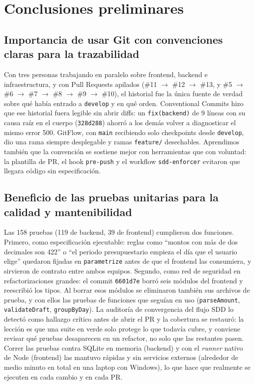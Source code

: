 \section{Conclusiones preliminares}

\subsection{Importancia de usar Git con convenciones claras para la trazabilidad}
Con tres personas trabajando en paralelo sobre frontend, backend e infraestructura, y con Pull Requests apilados (\#11 $\rightarrow$ \#12 $\rightarrow$ \#13, y \#5 $\rightarrow$ \#6 $\rightarrow$ \#7 $\rightarrow$ \#8 $\rightarrow$ \#9 $\rightarrow$ \#10), el historial fue la única fuente de verdad sobre qué había entrado a \texttt{develop} y en qué orden. Conventional Commits hizo que ese historial fuera legible sin abrir diffs: un \texttt{fix(backend)} de 9 líneas con su causa raíz en el cuerpo (\texttt{328d288}) ahorró a los demás volver a diagnosticar el mismo error 500. GitFlow, con \texttt{main} recibiendo solo checkpoints desde \texttt{develop}, dio una rama siempre desplegable y ramas \texttt{feature/} desechables. Aprendimos también que la convención se sostiene mejor con herramientas que con voluntad: la plantilla de PR, el hook \texttt{pre-push} y el workflow \texttt{sdd-enforcer} evitaron que llegara código sin especificación.

\subsection{Beneficio de las pruebas unitarias para la calidad y mantenibilidad}
Las 158 pruebas (119 de backend, 39 de frontend) cumplieron dos funciones. Primero, como especificación ejecutable: reglas como ``montos con más de dos decimales son 422'' o ``el periodo presupuestario empieza el día que el usuario elige'' quedaron fijadas en \texttt{parametrize} antes de que el frontend las consumiera, y sirvieron de contrato entre ambos equipos. Segundo, como red de seguridad en refactorizaciones grandes: el commit \texttt{6601d7e} borró seis módulos del frontend y reescribió los tipos. Al borrar esos módulos se eliminaron también sus archivos de prueba, y con ellos las pruebas de funciones que seguían en uso (\texttt{parseAmount}, \texttt{validateDraft}, \texttt{groupByDay}). La auditoría de convergencia del flujo SDD lo detectó como hallazgo crítico antes de abrir el PR y la cobertura se restauró: la lección es que una suite en verde solo protege lo que todavía cubre, y conviene revisar qué pruebas desaparecen en un refactor, no solo que las restantes pasen. Correr las pruebas contra SQLite en memoria (backend) y con el \emph{runner} nativo de Node (frontend) las mantuvo rápidas y sin servicios externos (alrededor de medio minuto en total en una laptop con Windows), lo que hace que realmente se ejecuten en cada cambio y en cada PR.

